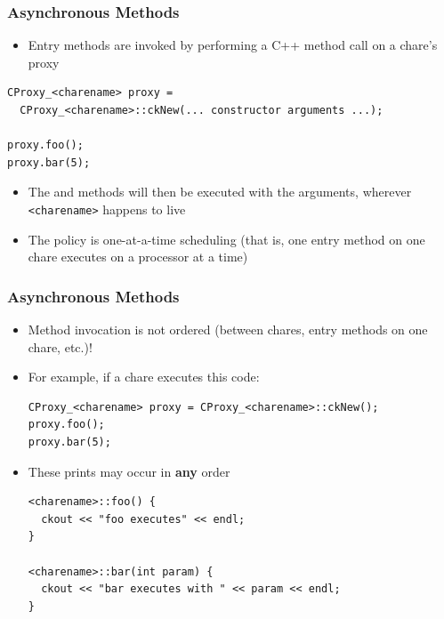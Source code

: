 \begin{frame}[fragile]
  \frametitle{Asynchronous Methods}
  \begin{itemize}
  \item Entry methods are invoked by performing a C++ method call on a chare's
    proxy
  \end{itemize}
  \begin{lstlisting}
CProxy_<charename> proxy =
  CProxy_<charename>::ckNew(... constructor arguments ...);

proxy.foo();
proxy.bar(5);
\end{lstlisting}
\begin{itemize}
\item The  and  methods will then be executed with the
  arguments, wherever \texttt{<charename>} happens to live
\item The policy is one-at-a-time scheduling (that is, one entry method on one
  chare executes on a processor at a time)
\end{itemize}
\end{frame}

\begin{frame}[fragile]
  \frametitle{Asynchronous Methods}
  \begin{itemize}
  \item Method invocation is not ordered (between chares, entry methods on one
    chare, etc.)!
  \item For example, if a chare executes this code:
  \begin{lstlisting}
CProxy_<charename> proxy = CProxy_<charename>::ckNew();
proxy.foo();
proxy.bar(5);
  \end{lstlisting}
  \item These prints may occur in \textbf{any} order
  \begin{lstlisting}
<charename>::foo() {
  ckout << "foo executes" << endl;
}

<charename>::bar(int param) {
  ckout << "bar executes with " << param << endl;
}
\end{lstlisting}
  \end{itemize}
\end{frame}

